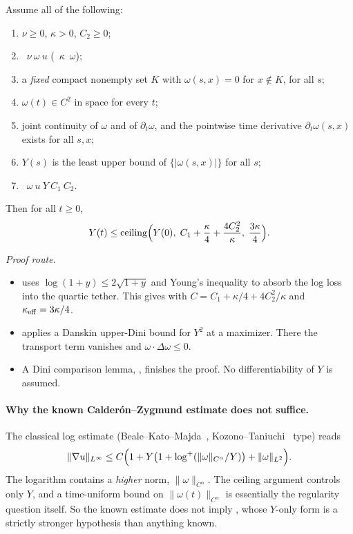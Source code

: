 \documentclass[11pt]{article}
\begin{document}
\begin{theorem}
Assume all of the following:
\begin{enumerate}
\item $\nu\ge0$, $\kappa>0$, $C_2\ge0$;
\item {}~$\nu\ \omega\ u$ (~$\kappa$~$\omega$);
\item a \emph{fixed} compact nonempty set $K$ with $\omega(s,x)=0$ for $x\notin K$, for all $s$;
\item $\omega(t)\in C^2$ in space for every $t$;
\item joint continuity of $\omega$ and of $\partial_t\omega$, and the pointwise time derivative $\partial_t\omega(s,x)$ exists for all $s,x$;
\item $Y(s)$ is the least upper bound of $\{|\omega(s,x)|\}$ for all $s$;
\item {}~$\omega\ u\ Y\ C_1\ C_2$.
\end{enumerate}
Then for all $t\ge0$,
\begin{equation}\label{eq:main}Y(t)\le\mathrm{ceiling}\Bigl(Y(0),\;C_1+\frac{\kappa}{4}+\frac{4C_2^2}{\kappa},\;\frac{3\kappa}{4}\Bigr).\end{equation}
\end{theorem}
\emph{Proof route.}
\begin{itemize}
\item {}\coined{} uses $\log(1+y)\le2\sqrt{1+y}$ and Young's inequality to absorb the log loss into the quartic tether. This gives  with $C=C_1+\kappa/4+4C_2^2/\kappa$ and $\kappa_{\rm eff}=3\kappa/4$.
\item {}\coined{} applies a Danskin upper-Dini bound for $Y^2$ at a maximizer. There the transport term vanishes and $\omega\cdot\Delta\omega\le0$.
\item A Dini comparison lemma, \coined, finishes the proof. No differentiability of $Y$ is assumed.
\end{itemize}

\paragraph{Why the known Calder\'on--Zygmund estimate does not suffice.}
The classical log estimate (Beale--Kato--Majda~\cite{BKM1984}, Kozono--Taniuchi~\cite{KozonoTaniuchi2000} type) reads
\begin{equation}\label{eq:bkmlog}\lVert\nabla u\rVert_{L^\infty}\le C\Bigl(1+Y\bigl(1+\log^+(\lVert\omega\rVert_{C^\alpha}/Y)\bigr)+\lVert\omega\rVert_{L^2}\Bigr).\end{equation}
The logarithm contains a \emph{higher} norm, $\|\omega\|_{C^\alpha}$. The ceiling argument controls only $Y$, and a time-uniform bound on $\|\omega(t)\|_{C^\alpha}$ is essentially the regularity question itself. So the known estimate does not imply , whose $Y$-only form is a strictly stronger hypothesis than anything known.
\end{document}
